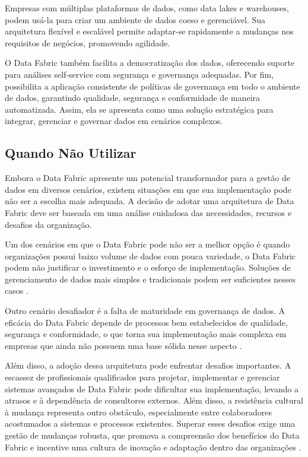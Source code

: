 Empresas com múltiplas plataformas de dados, como data lakes e warehouses, podem usá-la para criar um ambiente de dados coeso e gerenciável. Sua arquitetura flexível 
e escalável permite adaptar-se rapidamente a mudanças nos requisitos de negócios, promovendo agilidade.

O Data Fabric também facilita a democratização dos dados, oferecendo suporte para análises self-service com segurança e governança adequadas. Por fim, possibilita a 
aplicação consistente de políticas de governança em todo o ambiente de dados, garantindo qualidade, segurança e conformidade de maneira automatizada. Assim, ela se 
apresenta como uma solução estratégica para integrar, gerenciar e governar dados em cenários complexos.

\subsection{Quando Não Utilizar}
Embora o Data Fabric apresente um potencial transformador para a gestão de dados em diversos cenários, existem situações em que sua implementação pode não ser a escolha 
mais adequada. A decisão de adotar uma arquitetura de Data Fabric deve ser baseada em uma análise cuidadosa das necessidades, recursos e desafios da organização.

Um dos cenários em que o Data Fabric pode não ser a melhor opção é quando organizações possui baixo volume de dados com pouca variedade, o Data Fabric podem não 
justificar o investimento e o esforço de implementação. Soluções de gerenciamento de dados mais simples e tradicionais podem ser suficientes nesses casos \cite{barik2022data}.

Outro cenário desafiador é a falta de maturidade em governança de dados. A eficácia do Data Fabric depende de processos bem estabelecidos de qualidade, segurança 
e conformidade, o que torna sua implementação mais complexa em empresas que ainda não possuem uma base sólida nesse aspecto \cite{gade2024data}.

Além disso, a adoção dessa arquitetura pode enfrentar desafios importantes. A escassez de profissionais qualificados para projetar, implementar e gerenciar sistemas 
avançados de Data Fabric pode dificultar sua implementação, levando a atrasos e à dependência de consultores externos. Além disso, a resistência cultural à mudança 
representa outro obstáculo, especialmente entre colaboradores acostumados a sistemas e processos existentes. Superar esses desafios exige uma gestão de mudanças robusta, 
que promova a compreensão dos benefícios do Data Fabric e incentive uma cultura de inovação e adaptação dentro das organizações \cite{gade2024data}.


